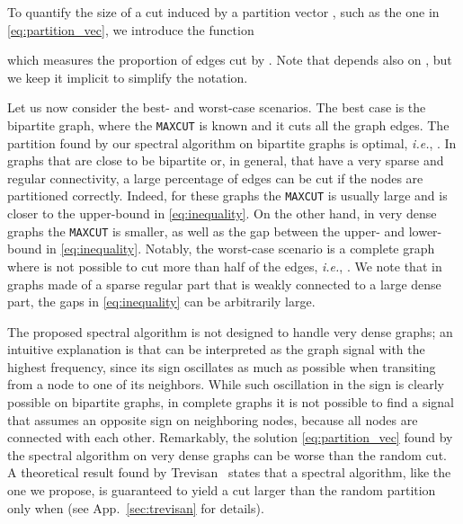 \documentclass[journal]{IEEEtran}
\newcommand{\maxcut}{\texttt{\small{MAXCUT}}}
\begin{document}
To quantify the size of a cut induced by a partition vector , such as the one in \eqref{eq:partition_vec}, we introduce the function

which measures the proportion of edges cut by .
Note that  depends also on , but we keep it implicit to simplify the notation.

Let us now consider the best- and worst-case scenarios.
The best case is the bipartite graph, where the \maxcut{} is known and it cuts all the graph edges.
The partition  found by our spectral algorithm on bipartite graphs is optimal, \textit{i.e.}, .
In graphs that are close to be bipartite or, in general, that have a very sparse and regular connectivity, a large percentage of edges can be cut if the nodes are partitioned correctly.
Indeed, for these graphs the \maxcut{} is usually large and is closer to the upper-bound in \eqref{eq:inequality}.
On the other hand, in very dense graphs the \maxcut{} is smaller, as well as the gap between the upper- and lower-bound in \eqref{eq:inequality}. 
Notably, the worst-case scenario is a complete graph where is not possible to cut more than half of the edges, \textit{i.e.}, .
We note that in graphs made of a sparse regular part that is weakly connected to a large dense part, the gaps in \eqref{eq:inequality} can be arbitrarily large.

The proposed spectral algorithm is not designed to handle very dense graphs; an intuitive explanation is that  can be interpreted as the graph signal with the highest frequency, since its sign oscillates as much as possible when transiting from a node to one of its neighbors. 
While such oscillation in the sign is clearly possible on bipartite graphs, in complete graphs it is not possible to find a signal that assumes an opposite sign on neighboring nodes, because all nodes are connected with each other.
Remarkably, the solution \eqref{eq:partition_vec} found by the spectral algorithm on very dense graphs can be worse than the random cut.
A theoretical result found by Trevisan~\cite{trevisan2012max} states that a spectral algorithm, like the one we propose, is guaranteed to yield a cut larger than the random partition only when  (see App.~\ref{sec:trevisan} for details).
\end{document}
